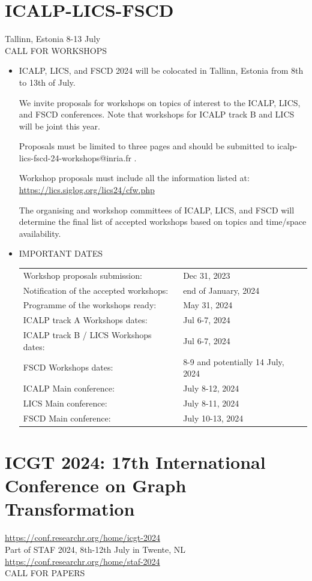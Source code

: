 \documentclass[prodmode,acmtecs]{acmsmall} %
\begin{document}
\section{ICALP-LICS-FSCD}\label{ICALPLICSFSCD}	Tallinn, Estonia 8-13 July\\ 
CALL FOR WORKSHOPS 

\begin{itemize}\item  ICALP, LICS, and FSCD 2024 will be colocated in Tallinn, Estonia from 8th to 13th of July. 
 
  We invite proposals for workshops on topics of interest to the ICALP, LICS, and FSCD conferences. Note that workshops for ICALP track B and LICS will be joint this year. 
 
  Proposals must be limited to three pages and should be submitted to  icalp-lics-fscd-24-workshops@inria.fr .  
 
  Workshop proposals must include all the information listed at: \href{https://lics.siglog.org/lics24/cfw.php}{https://lics.siglog.org/lics24/cfw.php} 
 
  The organising and workshop committees of ICALP, LICS, and FSCD will determine the final list of accepted workshops based on topics and time/space availability. 
 
\item  IMPORTANT DATES 
 
\begin{tabulary}{\linewidth}{LL}Workshop proposals submission:  & Dec 31, 2023 \\
Notification of the accepted workshops:  & end of January, 2024 \\
Programme of the workshops ready:  & May 31, 2024 \\
ICALP track A Workshops dates:  & Jul 6-7, 2024 \\
ICALP track B / LICS Workshops dates:  & Jul 6-7, 2024 \\
FSCD Workshops dates:  & 8-9 and potentially 14 July, 2024 \\
ICALP Main conference:  & July 8-12, 2024 \\
LICS Main conference:  & July 8-11, 2024 \\
FSCD Main conference:  & July 10-13, 2024 \\
\end{tabulary}
 
\end{itemize}\section{ICGT 2024: 17th International Conference on Graph Transformation}\label{ICGT2024}  \href{https://conf.researchr.org/home/icgt-2024}{https://conf.researchr.org/home/icgt-2024}\\ 
  Part of STAF 2024, 8th-12th July in Twente, NL \href{https://conf.researchr.org/home/staf-2024}{https://conf.researchr.org/home/staf-2024}\\ 
CALL FOR PAPERS 
\end{document}
